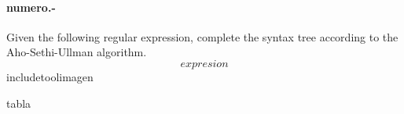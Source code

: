 

\paragraph{{numero}.-}\label{p{numero}}
Given the following regular expression, complete the syntax tree according to the Aho-Sethi-Ullman algorithm.
\[
    {expresion}
\]
    {includetool}{{imagen}}
    
{tabla}
